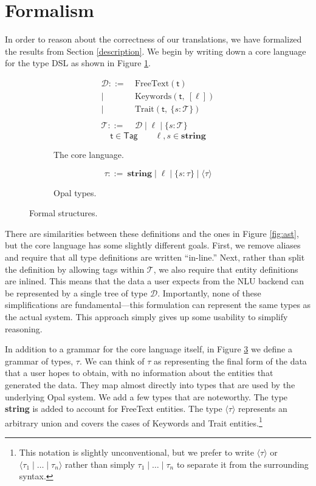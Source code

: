 \documentclass[twocolumn]{article}
\newcommand{\fcy}[1]{\mathcal{#1}}
\newcommand{\etag}[1]{\textsf{#1}}
\newcommand{\ff}[1]{\textsf{#1}}
\begin{document}
\section{Formalism} \label{formalism}
In order to reason about the correctness of our translations, we have formalized
the results from Section \ref{description}. We begin by writing down a core
language for the type DSL as shown in Figure \ref{fig:grammar_a}.
\begin{figure}
  \centering
  \begin{subfigure}{1\linewidth}
    \begin{align*}
      \fcy{D} ::=&\ \text{FreeText}(\etag{t}) \\
      |&\ \text{Keywords}(\etag{t},\ [\ell]) \\
      |&\ \text{Trait}(\etag{t},\ \{s: \fcy{T}\}) \\
      \\
      \fcy{T} ::=&\ \fcy{D} \mid \ell \mid \{s: \fcy{T}\}
    \end{align*}
    $$ \etag{t} \in \ff{Tag} \qquad \ell, s \in \textbf{string} $$
    \caption{The core language.}
    \label{fig:grammar_a}
  \end{subfigure}\vspace{1cm}
  \begin{subfigure}{1\linewidth}
    $$ \tau ::=\ \textbf{string} \mid \ell \mid \{s: \tau\} \mid \langle \tau
    \rangle $$
    \caption{Opal types.}
    \label{fig:grammar_b}
  \end{subfigure}
  \caption{Formal structures.}
\end{figure}
There are similarities between these definitions and the ones in Figure
\ref{fig:ast}, but the core language has some slightly different goals. First,
we remove aliases and require that all type definitions are written ``in-line.''
Next, rather than split the definition by allowing tags within $\fcy{T}$, we
also require that entity definitions are inlined. This means that the data a
user expects from the NLU backend can be represented by a single tree of type
$\fcy{D}$. Importantly, none of these simplifications are fundamental---this
formulation can represent the same types as the actual system. This approach
simply gives up some usability to simplify reasoning.

In addition to a grammar for the core language itself, in Figure
\ref{fig:grammar_b} we define a grammar of types, $\tau$. We can think of $\tau$
as representing the final form of the data that a user hopes to obtain, with no
information about the entities that generated the data. They map almost directly
into types that are used by the underlying Opal system. We add a few types that
are noteworthy. The type {\bf string} is added to account for FreeText entities.
The type $\langle {\tau} \rangle$ represents an arbitrary union and covers the
cases of Keywords and Trait entities.\footnote{This notation is slightly
unconventional, but we prefer to write $\langle \tau \rangle$ or $\langle \tau_1
\mid \dots \mid \tau_n \rangle$ rather than simply $\tau_1 \mid \dots \mid
\tau_n$ to separate it from the surrounding syntax.}
\end{document}
